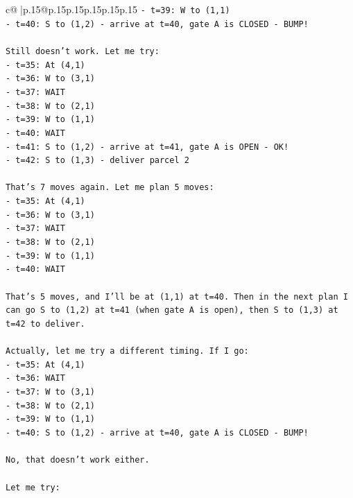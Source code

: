 \documentclass{article}
\begin{document}
{\begin{supertabular}{c@{$\;$}|p{.15\linewidth}@{}p{.15\linewidth}p{.15\linewidth}p{.15\linewidth}p{.15\linewidth}p{.15\linewidth}}
{{{\texttt{{-} t=39: W to (1,1)} \\
\texttt{{-} t=40: S to (1,2) {-} arrive at t=40, gate A is CLOSED {-} BUMP!} \\
\\ 
\texttt{Still doesn't work. Let me try:} \\
\texttt{{-} t=35: At (4,1)} \\
\texttt{{-} t=36: W to (3,1)} \\
\texttt{{-} t=37: WAIT} \\
\texttt{{-} t=38: W to (2,1)} \\
\texttt{{-} t=39: W to (1,1)} \\
\texttt{{-} t=40: WAIT} \\
\texttt{{-} t=41: S to (1,2) {-} arrive at t=41, gate A is OPEN {-} OK!} \\
\texttt{{-} t=42: S to (1,3) {-} deliver parcel 2} \\
\\ 
\texttt{That's 7 moves again. Let me plan 5 moves:} \\
\texttt{{-} t=35: At (4,1)} \\
\texttt{{-} t=36: W to (3,1)} \\
\texttt{{-} t=37: WAIT} \\
\texttt{{-} t=38: W to (2,1)} \\
\texttt{{-} t=39: W to (1,1)} \\
\texttt{{-} t=40: WAIT} \\
\\ 
\texttt{That's 5 moves, and I'll be at (1,1) at t=40. Then in the next plan I can go S to (1,2) at t=41 (when gate A is open), then S to (1,3) at t=42 to deliver.} \\
\\ 
\texttt{Actually, let me try a different timing. If I go:} \\
\texttt{{-} t=35: At (4,1)} \\
\texttt{{-} t=36: WAIT} \\
\texttt{{-} t=37: W to (3,1)} \\
\texttt{{-} t=38: W to (2,1)} \\
\texttt{{-} t=39: W to (1,1)} \\
\texttt{{-} t=40: S to (1,2) {-} arrive at t=40, gate A is CLOSED {-} BUMP!} \\
\\ 
\texttt{No, that doesn't work either.} \\
\\ 
\texttt{Let me try:} \\
}}}
\end{supertabular}}
\end{document}
